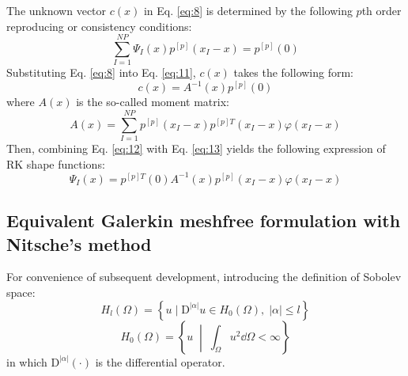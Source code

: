 The unknown vector $c(x)$ in Eq. \eqref{eq:8} is determined by the following $p$th order reproducing or consistency conditions:
\begin{equation}\label{eq:11}
\sum_{I=1}^{NP}\Psi_I(x)p^{[p]}(x_I-x)=p^{[p]}(0)
\end{equation}
Substituting Eq. \eqref{eq:8} into Eq. \eqref{eq:11}, $c(x)$ takes the following form:
\begin{equation}\label{eq:12}
c(x)=A^{-1}(x)p^{[p]}(0)
\end{equation}
where $A(x)$ is the so-called moment matrix:
\begin{equation}\label{eq:13}
A(x)=\sum_{I=1}^{NP}p^{[p]}(x_I-x)p^{[p]T}(x_I-x)\varphi(x_I-x)
\end{equation}
Then, combining Eq. \eqref{eq:12} with Eq. \eqref{eq:13} yields the following expression of RK shape functions:
\begin{equation}\label{eq:14}
\Psi_I(x)=p^{[p]T}(0)A^{-1}(x)p^{[p]}(x_I-x)\varphi(x_I-x)
\end{equation}

\subsection{Equivalent Galerkin meshfree formulation with Nitsche's method}\label{sec:nitsche}

For convenience of subsequent development, introducing the definition of Sobolev space:
\begin{equation}\label{eq:15}
H_l(\Omega)=\left\{u\mid \mathrm{D}^{|\alpha|}u\in H_0(\Omega),\;|\alpha|\le l\right\}
\end{equation}
\begin{equation}\label{eq:16}
H_0(\Omega)=\left\{u\;\middle|\;\int_{\Omega}u^{2}\dd\Omega<\infty\right\}
\end{equation}
in which $\mathrm{D}^{|\alpha|}(\cdot)$ is the differential operator.

